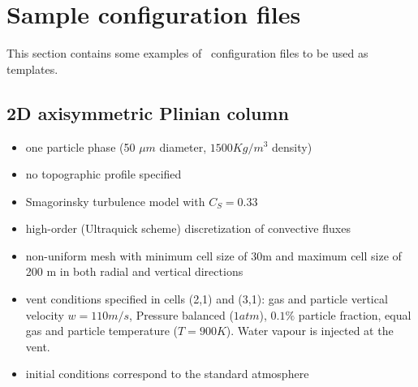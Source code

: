 \section{Sample configuration files}
\label{section:input_sample}
This section contains some examples of \PDAC\ configuration files to be used
as templates.
\prettypar
\subsection{2D axisymmetric Plinian column}
\begin{itemize}
\item one particle phase (50 $\mu m$ diameter, $1500 Kg/m^3$ density)
\item no topographic profile specified
\item Smagorinsky turbulence model with $C_S=0.33$
\item high-order (Ultraquick scheme) discretization of convective fluxes
\item non-uniform mesh with minimum cell size of 30m and maximum cell size
      of 200 m in both radial and vertical directions
\item vent conditions specified in cells (2,1) and (3,1): gas and particle
      vertical velocity $w = 110 m/s$, Pressure balanced ($1atm$), $0.1\%$
      particle fraction, equal gas and particle temperature ($T=900 K$).
      Water vapour is injected at the vent.
\item initial conditions correspond to the standard atmosphere
\end{itemize}

